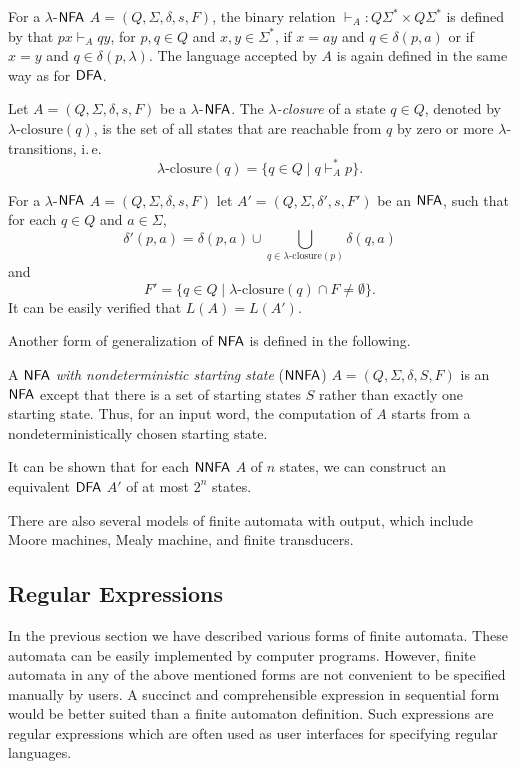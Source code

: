 For a \index{$\lambda$-$\NFA$}$\lambda$-$\NFA$ $A = (Q, \Sigma, \delta, s, F)$, the binary relation $\vdash_A: Q \Sigma^* \times Q \Sigma^*$ is defined by that $px \vdash_A qy$, for $p, q \in Q$ and $x, y \in \Sigma^*$, if $x = ay$ and $q \in \delta(p, a)$ or if $x = y$ and $q \in \delta(p, \lambda)$. The language accepted by $A$ is again defined in the same way as for \index{$\DFA$}$\DFA$.

Let $A = (Q, \Sigma, \delta, s, F)$ be a \index{$\lambda$-$\NFA$}$\lambda$-$\NFA$. The \emph{$\lambda$-closure} of a state $q \in Q$, denoted by $\lambda \text{-closure}(q)$, is the set of all states that are reachable from $q$ by zero or more $\lambda$-transitions, i.\,e.
$$\lambda \text{-closure}(q) = \{q \in Q \mid q \vdash_A^* p \}.$$

For a \index{$\lambda$-$\NFA$}$\lambda$-$\NFA$ $A = (Q, \Sigma, \delta, s, F)$ let $A' = (Q, \Sigma, \delta', s, F')$ be an \index{$\NFA$}$\NFA$, such that for each $q \in Q$ and $a \in \Sigma$,
$$\delta'(p, a) = \delta(p, a) \cup \bigcup_{q \in \lambda \text{-closure}(p)}\delta(q, a)$$
and
$$F' = \{ q \in Q \mid \lambda\text{-closure}(q) \cap F \neq \emptyset \}.$$
It can be easily verified that $L(A) = L(A')$.

Another form of generalization of \index{$\NFA$}$\NFA$ is defined in the following.

A \emph{$\NFA$ with nondeterministic starting state} \index{$\NNFA$}($\NNFA$) $A = (Q, \Sigma, \delta, S, F)$ is an \index{$\NFA$}$\NFA$ except that there is a set of starting states $S$ rather than exactly one starting state. Thus, for an input word, the computation of $A$ starts from a nondeterministically chosen starting state.

It can be shown that for each $\NNFA$ $A$ of $n$ states, we can construct an equivalent \index{$\DFA$}$\DFA$ $A'$ of at most $2^n$ states.

There are also several models of finite automata with output, which include Moore machines, Mealy machine, and finite transducers.

\subsection{Regular Expressions}
\label{subsection:regular-expressions}

In the previous section we have described various forms of finite automata. These automata can be easily implemented by computer programs. However, finite automata in any of the above mentioned forms are not convenient to be specified manually by users. A succinct and comprehensible expression in sequential form would be better suited than a finite automaton definition. Such expressions are regular expressions which are often used as user interfaces for specifying regular languages.

